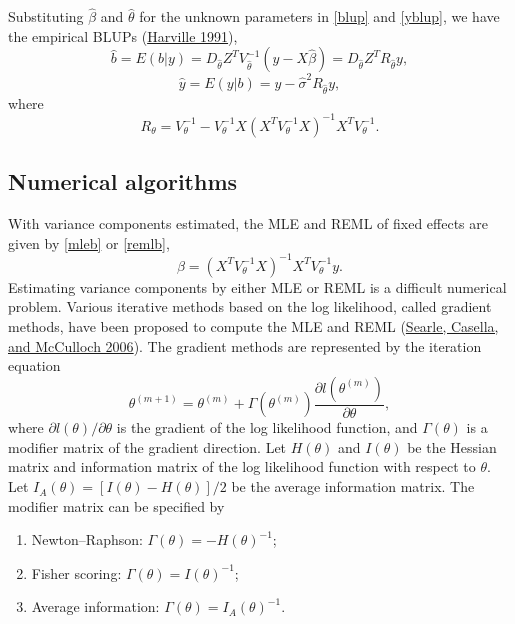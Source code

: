 \documentclass[
]{article}
\providecommand{\tightlist}{%
  \setlength{\itemsep}{0pt}\setlength{\parskip}{0pt}}
\begin{document}
Substituting \(\hat\beta\) and \(\hat\theta\) for the unknown parameters
in \eqref{blup} and \eqref{yblup}, we have the empirical BLUPs
(\protect\hyperlink{ref-Harville1991}{Harville 1991}),
\begin{equation}\label{eblup}
\hat b = E(b|y) = D_{\hat\theta}Z^TV_{\hat\theta}^{-1}(y-X\hat\beta) = D_{\hat\theta}Z^TR_{\hat\theta}y,
\end{equation} \begin{equation}\label{yeblup}
\hat y = E(y|b) = y - \hat\sigma^2R_{\hat\theta} y,
\end{equation} where \[
R_{\theta} = V_{\theta}^{-1} - V_{\theta}^{-1}X(X^TV_{\theta}^{-1}X)^{-1}X^TV_{\theta}^{-1}.
\]

\hypertarget{numerical-algorithms}{%
\subsection{\texorpdfstring{Numerical
algorithms\label{numerical}}{Numerical algorithms}}\label{numerical-algorithms}}

With variance components estimated, the MLE and REML of fixed effects
are given by \eqref{mleb} or \eqref{remlb}, \[
\hat\beta = (X^TV_{\theta}^{-1}X )^{-1}X^TV_{\theta}^{-1}y.
\] Estimating variance components by either MLE or REML is a difficult
numerical problem. Various iterative methods based on the log
likelihood, called gradient methods, have been proposed to compute the
MLE and REML (\protect\hyperlink{ref-Searle2006}{Searle, Casella, and
McCulloch 2006}). The gradient methods are represented by the iteration
equation \begin{equation}\label{gradient}
\theta^{(m+1)} = \theta^{(m)} + \Gamma(\theta^{(m)})\frac{\partial l(\theta^{(m)})}{\partial\theta},
\end{equation} where \(\partial l(\theta)/\partial\theta\) is the
gradient of the log likelihood function, and \(\Gamma(\theta)\) is a
modifier matrix of the gradient direction. Let \(H(\theta)\) and
\(I(\theta)\) be the Hessian matrix and information matrix of the log
likelihood function with respect to \(\theta\). Let
\(I_A(\theta) = [I(\theta)-H(\theta)]/2\) be the average information
matrix. The modifier matrix can be specified by

\begin{enumerate}
\def\labelenumi{\arabic{enumi})}
\tightlist
\item
  Newton--Raphson: \(\Gamma(\theta) = - H(\theta)^{-1}\);
\item
  Fisher scoring: \(\Gamma(\theta) = I(\theta)^{-1}\);
\item
  Average information: \(\Gamma(\theta) = I_A(\theta)^{-1}\).
\end{enumerate}
\end{document}
